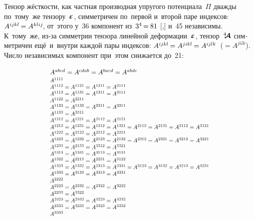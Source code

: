 \begin{otherlanguage}{russian}
\vspace{-0.1em} Тензор жёсткости, как частная производная упругого потенциала~$\Pi$ дважды по~тому~же тензору~$\mathboldepsilon$, симметричен по~первой и~второй паре индексов: ${A^{ijkl} \hspace{-0.16ex} = A^{klij}\hspace{-0.25ex}}$, от~этого у~36 компонент из~${3^4 \hspace{-0.24ex}=\hspace{-0.12ex} 81}$ [,] и~45 независимы. К~тому~же, из\hbox{-}за симметрии тензора линейной деформации~$\mathboldepsilon$, тензор~$\hspace{.08ex}{^4\hspace{-0.72ex}\bm{\mathcal{A}}}\hspace{.08ex}$ симметричен ещё~и~внутри каждой пары индексов: ${A^{ijkl} \hspace{-0.16ex} = A^{jikl} \hspace{-0.16ex} = A^{ijlk}}$~(${= A^{jilk}}$). Число независимых компонент при~этом снижается до~21:

\nopagebreak\vspace{-0.25em}\begin{equation*}\scalebox{0.8}{$\begin{array}{l}
\scalebox{1.16}{$A^{abcd^{\mathstrut}} = A^{cdab} = A^{bacd} = A^{abdc}$} \\[0.2em]
%
A^{1111} \\
A^{1112} = A^{1121} = A^{1211} = A^{2111} \\
A^{1113} = A^{1131} = A^{1311} = A^{3111} \\
A^{1122} = A^{2211} \\
A^{1123} = A^{1132} = A^{2311} = A^{3211} \\
A^{1133} = A^{3311} \\
A^{1212} = A^{1221} = A^{2112} = A^{2121} \\
A^{1213} = A^{1231} = A^{1312} = A^{1321} = A^{2113} = A^{2131} = A^{3112} = A^{3121} \\
A^{1222} = A^{2122} = A^{2212} = A^{2221} \\
A^{1223} = A^{1232} = A^{2123} = A^{2132} = A^{2312} = A^{2321} = A^{3212} = A^{3221} \\
A^{1233} = A^{2133} = A^{3312} = A^{3321} \\
A^{1313} = A^{1331} = A^{3113} = A^{3131} \\
A^{1322} = A^{2213} = A^{2231} = A^{3122} \\
A^{1323} = A^{1332} = A^{2313} = A^{2331} = A^{3123} = A^{3132} = A^{3213} = A^{3231} \\
A^{1333} = A^{3133} = A^{3313} = A^{3331} \\
A^{2222} \\
A^{2223} = A^{2232} = A^{2322} = A^{3222} \\
A^{2233} = A^{3322} \\
A^{2323} = A^{2332} = A^{3223} = A^{3232} \\
A^{2333} = A^{3233} = A^{3323} = A^{3332} \\
A^{3333} \\
\end{array}$}
\end{equation*}


\end{otherlanguage}

